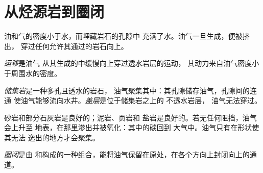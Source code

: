 \section{从烃源岩到圈闭}

油和气的密度小于水，而埋藏岩石的孔隙中
充满了水。油气一旦生成，便被挤出，
穿过任何允许其通过的岩石向上。

\begin{definition}[运移]\label{def:g11:fossil-fuel-geology:migration}
\emph{运移}是油气
从其生成的中缓慢向上穿过透水岩层的运动，
其动力来自油气密度小于周围水的密度。
\end{definition}

\begin{definition}[储集岩；盖层]\label{def:g11:fossil-fuel-geology:reservoir}
\emph{储集岩}是一种多孔且透水的岩石，
油气聚集其中：其孔隙储存油气，孔隙间的连通
使油气能够流向水井。\emph{盖层}是位于储集岩之上的
不透水岩层，
油气无法穿过。
\end{definition}

砂岩和部分石灰岩是良好的；泥岩、页岩和
盐岩是良好的。若无任何阻挡，油气会上升至
地表，在那里渗出并被氧化：其中的碳回到
大气中。油气只有在形状使其无法
逸出的地方才会聚集。

\begin{definition}[圈闭]\label{def:g11:fossil-fuel-geology:trap}
\emph{圈闭}是由
和构成的一种组合，能将油气保留在原处，在各个方向上封闭向上的通道。
\end{definition}

